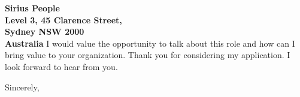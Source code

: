 \documentclass{letter}
\begin{document}
\begin{letter}{\bf Sirius People \\Level 3, 45 Clarence Street, \\Sydney NSW 2000 \\ Australia}
I would value the opportunity to talk about this role and how can I bring value to your organization.   
Thank you for considering my application. I look forward to hear from you.




\closing{Sincerely,
} 

\end{letter}
\end{document}
